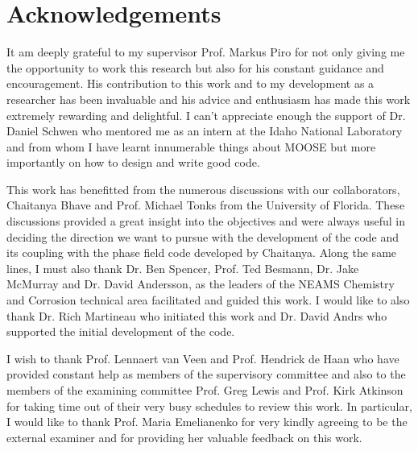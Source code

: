 \chapter*{Acknowledgements}
\label{acknowledgements}

It am deeply grateful to my supervisor Prof. Markus Piro for not only giving me the opportunity to work this research but also for his constant guidance and encouragement. His contribution to this work and to my development as a researcher has been invaluable and his advice and enthusiasm has made this work extremely rewarding and delightful. I can't appreciate enough the support of Dr. Daniel Schwen who mentored me as an intern at the Idaho National Laboratory and from whom I have learnt innumerable things about MOOSE but more importantly on how to design and write good code.

This work has benefitted from the numerous discussions with our collaborators, Chaitanya Bhave and Prof. Michael Tonks from the University of Florida. These discussions provided a great insight into the objectives and were always useful in deciding the direction we want to pursue with the development of the code and its coupling with the phase field code developed by Chaitanya. Along the same lines, I must also thank Dr. Ben Spencer, Prof. Ted Besmann, Dr. Jake McMurray and Dr. David Andersson, as the leaders of the NEAMS Chemistry and Corrosion technical area facilitated and guided this work. I would like to also thank Dr. Rich Martineau who initiated this work and Dr. David Andrs who supported the initial development of the code.

I wish to thank Prof. Lennaert van Veen and Prof. Hendrick de Haan who have provided constant help as members of the supervisory committee and also to the members of the examining committee Prof. Greg Lewis and Prof. Kirk Atkinson for taking time out of their very busy schedules to review this work. In particular, I would like to thank Prof. Maria Emelianenko for very kindly agreeing to be the external examiner and for providing her valuable feedback on this work.

